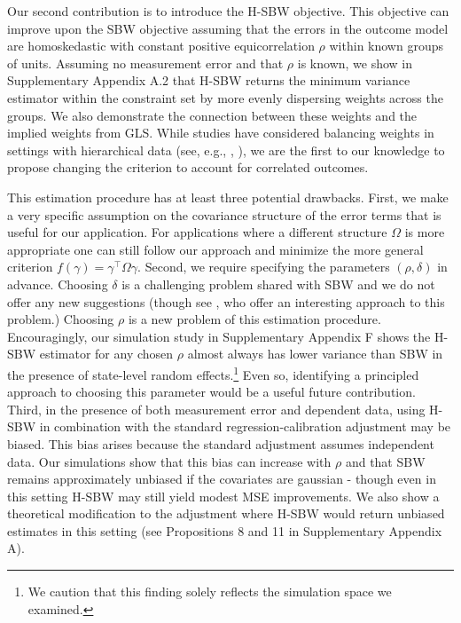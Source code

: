 \documentclass[aoas]{imsart}
\theoremstyle{plain}
\theoremstyle{remark}
\begin{document}
Our second contribution is to introduce the H-SBW objective. This objective can improve upon the SBW objective assuming that the errors in the outcome model are homoskedastic with constant positive equicorrelation $\rho$ within known groups of units. Assuming no measurement error and that $\rho$ is known, we show in Supplementary Appendix A.2 that H-SBW returns the minimum variance estimator within the constraint set by more evenly dispersing weights across the groups. We also demonstrate the connection between these weights and the implied weights from GLS. While studies have considered balancing weights in settings with hierarchical data (see, e.g., \citet{keele2020hospital}, \citet{ben2021multilevel}), we are the first to our knowledge to propose changing the criterion to account for correlated outcomes.

This estimation procedure has at least three potential drawbacks. First, we make a very specific assumption on the covariance structure of the error terms that is useful for our application. For applications where a different structure $\Omega$ is more appropriate one can still follow our approach and minimize the more general criterion $f(\gamma) = \gamma^\top\Omega\gamma$. Second, we require specifying the parameters $(\rho, \delta)$ in advance. Choosing $\delta$ is a challenging problem shared with SBW and we do not offer any new suggestions (though see \citet{wang2020minimal}, who offer an interesting approach to this problem.) Choosing $\rho$ is a new problem of this estimation procedure. Encouragingly, our simulation study in Supplementary Appendix F shows the H-SBW estimator for any chosen $\rho$ almost always has lower variance than SBW in the presence of state-level random effects.\footnote{We caution that this finding solely reflects the simulation space we examined.} Even so, identifying a principled approach to choosing this parameter would be a useful future contribution. Third, in the presence of both measurement error and dependent data, using H-SBW in combination with the standard regression-calibration adjustment may be biased. This bias arises because the standard adjustment assumes independent data. Our simulations show that this bias can increase with $\rho$ and that SBW remains approximately unbiased if the covariates are gaussian - though even in this setting H-SBW may still yield modest MSE improvements. We also show a theoretical modification to the adjustment where H-SBW would return unbiased estimates in this setting (see Propositions 8 and 11 in Supplementary Appendix A).
\end{document}
